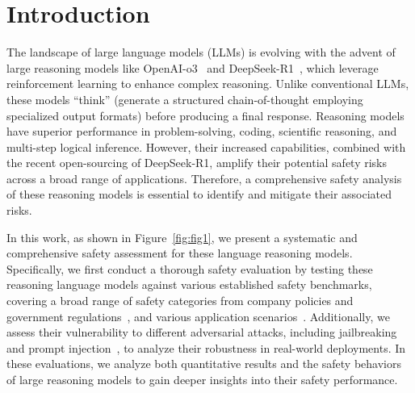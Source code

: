 \section{Introduction}


The landscape of large language models (LLMs) is evolving with the advent of large reasoning models like OpenAI-o3~\cite{o3minicard} and DeepSeek-R1~\cite{guo2025deepseek}, which leverage reinforcement learning to enhance complex reasoning. Unlike conventional LLMs, these models ``think'' (generate a structured chain-of-thought employing specialized output formats) before producing a final response. Reasoning models have superior performance in problem-solving, coding, scientific reasoning, and multi-step logical inference. 
However, their increased capabilities, combined with the recent open-sourcing of DeepSeek-R1, amplify their potential safety risks across a broad range of applications. 
Therefore, a comprehensive safety analysis of these reasoning models is essential to identify and mitigate their associated risks.


In this work, as shown in Figure~\ref{fig:fig1}, we present a systematic and comprehensive safety assessment for these language reasoning models.
Specifically, we first conduct a thorough safety evaluation by testing these reasoning language models against various established safety benchmarks, covering a broad range of safety categories from company policies and government regulations~\cite{zeng2024air}, and various application scenarios~\cite{wan2024cyberseceval}. Additionally, we assess their vulnerability to different adversarial attacks, including jailbreaking and prompt injection~\cite{jiang2024wildteaming,wan2024cyberseceval}, to analyze their robustness in real-world deployments. In these evaluations, we analyze both quantitative results and the safety behaviors of large reasoning models to gain deeper insights into their safety performance.

